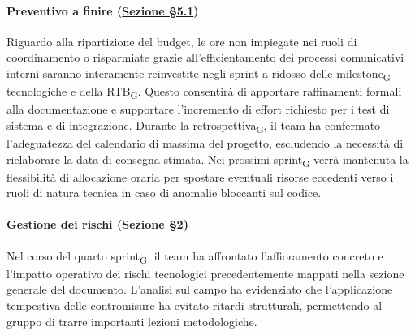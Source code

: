 \documentclass[a4paper, 10pt, colorlinks=true, linkcolor=black, urlcolor=blue, citecolor=blue, hidelinks]{article}
\begin{document}
\paragraph{Preventivo a finire (\hyperref[tab:preventivo-finire]{Sezione \S5.1})}
Riguardo alla ripartizione del budget, le ore non impiegate nei ruoli di coordinamento o risparmiate grazie all'efficientamento dei processi comunicativi interni saranno interamente reinvestite negli sprint a ridosso delle milestone\textsubscript{G} tecnologiche e della RTB\textsubscript{G}. Questo consentirà di apportare raffinamenti formali alla documentazione e supportare l'incremento di effort richiesto per i test di sistema e di integrazione. Durante la retrospettiva\textsubscript{G}, il team ha confermato l'adeguatezza del calendario di massima del progetto, escludendo la necessità di rielaborare la data di consegna stimata. Nei prossimi sprint\textsubscript{G} verrà mantenuta la flessibilità di allocazione oraria per spostare eventuali risorse eccedenti verso i ruoli di natura tecnica in caso di anomalie bloccanti sul codice.

\paragraph{Gestione dei rischi (\hyperref[tab:gestione-rischi]{Sezione \S2})}
Nel corso del quarto sprint\textsubscript{G}, il team ha affrontato l'affioramento concreto e l'impatto operativo dei rischi tecnologici precedentemente mappati nella sezione generale del documento. L'analisi sul campo ha evidenziato che l'applicazione tempestiva delle contromisure ha evitato ritardi strutturali, permettendo al gruppo di trarre importanti lezioni metodologiche.
\end{document}
